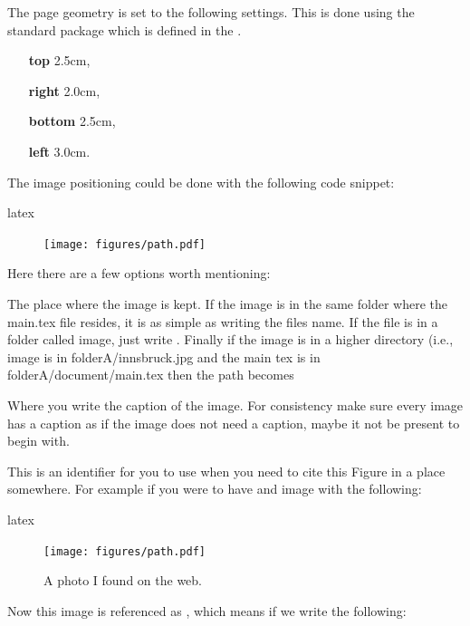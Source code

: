 \documentclass[minted, draw]{../tex/hebdomon}
\begin{document}
The page geometry is set to the following settings. This is done using the
standard package \pcode{\usepackage{geometry}} which is defined in the
.
%
\begin{itemize}[leftmargin=!,labelindent=-29.2pt]
	\item[\textbf{top}] 2.5cm,
	\item[\textbf{right}] 2.0cm,
	\item[\textbf{bottom}] 2.5cm,
	\item[\textbf{left}] 3.0cm.
\end{itemize}
%
%
The image positioning could be done with the following code snippet:
%
\begin{code}{latex}
\begin{figure}[ht]
  \centering
  \texttt{[image: figures/path.pdf]}
  \caption{\label{fig:label} }
\end{figure}
\end{code}
%
Here there are a few options worth mentioning:
%
\begin{hgitemize}
	\item[\pcode{figures/path}] The place where the image is kept. If the
	image is in the same folder where the main.tex file resides, it is as
	simple as writing the files name. If the file is in a folder called
	image, just write . Finally if the image is
	in a higher directory (i.e., image is in folderA/innsbruck.jpg and the
	main tex is in folderA/document/main.tex then the path becomes 
	\item[\pcode{\caption{..}}] Where you write the caption of the image.
	For consistency make sure every image has a caption as if the image does not
	need a caption, maybe it not be present to begin with.
	\item[\pcode{label{}}] This is an identifier for you to use when you need
	to cite this Figure in a place somewhere. For example if you were to have
	and image with the following:
\end{hgitemize}
%
\begin{code}{latex}
\begin{figure}[ht]
  \centering
  \texttt{[image: figures/path.pdf]}
  \caption{A photo I found on the web.}\label{fig:innsbruck}
\end{figure}
\end{code}
%
\begin{hgitemize}
	\item[] Now this image is referenced as , which
	means if we write the following:
\end{hgitemize}
\end{document}
